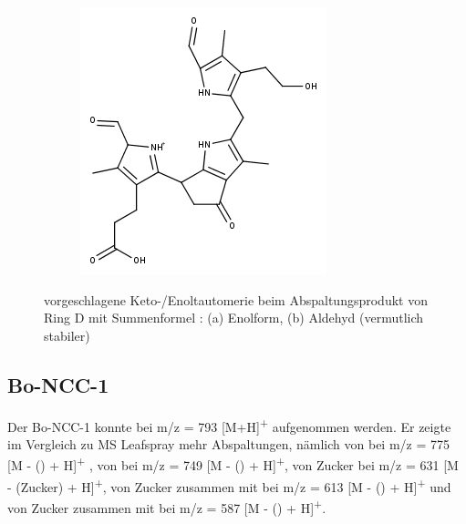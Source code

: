 \begin{figure}[!htbp]
\begin{subfigure}[b]{0.5\textwidth}
    \includegraphics[width=\textwidth]{figures/Kapitel7/Kataboliten/fragmentation_structures/VWA_Katabolit_647-CO2-RingD_480_MH_Ketoform.png}
    \caption{}
    \label{fig:DNCC2991}
  \end{subfigure}
  \caption[vorgeschlagene Keto-/Enoltautomerie der Ring D Abspaltung von Bo-NCC-3, Quelle: Autor]{vorgeschlagene Keto-/Enoltautomerie beim Abspaltungsprodukt von Ring D mit Summenformel : (a) Enolform, (b) Aldehyd (vermutlich stabiler)}
\end{figure}

\pagebreak
\subsection{Bo-NCC-1} \label{sec:ESIMSBoNCC1}

Der Bo-NCC-1 konnte bei m/z = 793 [M+H]\textsuperscript{+} aufgenommen werden. Er zeigte im Vergleich zu MS Leafspray mehr Abspaltungen, nämlich von  bei m/z = 775 [M - () + H]\textsuperscript{+} , von  bei m/z = 749 [M - () + H]\textsuperscript{+}, von Zucker bei m/z = 631 [M - (Zucker) + H]\textsuperscript{+}, von Zucker zusammen mit  bei m/z = 613 [M - () + H]\textsuperscript{+} und von Zucker zusammen mit  bei m/z = 587 [M - () + H]\textsuperscript{+}. 

